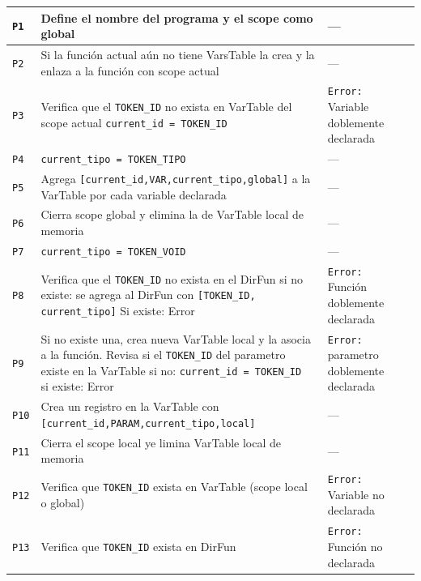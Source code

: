 \documentclass[12pt, letterpaper]{article}
\theoremstyle{definition}
\begin{document}
\begin{longtable}{|p{1cm}|p{5.5cm}|p{4cm}|p{3cm}|}
    \texttt{P1} &
    Define el nombre del programa y el scope como global &
    --- \\ \hline
    \texttt{P2} &
    Si la función actual aún no tiene  VarsTable la crea y la enlaza a la función  con scope actual&
    --- \\ \hline
    \texttt{P3} &
    Verifica que el \texttt{TOKEN\_ID} no exista en VarTable del scope actual 
    \break \break 
    \texttt{{{current\_id = TOKEN\_ID}}} &
    \texttt{Error:} Variable doblemente declarada \\ \hline
    \texttt{P4} & 
    \texttt{{{current\_tipo = TOKEN\_TIPO}}}  &
    --- \\ \hline
    \texttt{P5} & 
    Agrega 
    \break 
    \texttt{[current\_id,VAR,current\_tipo,\break global]}
    \break
    a la VarTable por cada variable declarada&
    --- \\ \hline
    \texttt{P6} & 
     Cierra scope global y elimina la de VarTable local de memoria &
    --- \\ \hline
    \texttt{P7} &
    \texttt{{{current\_tipo = TOKEN\_VOID}}}   &
    --- \\ \hline
    \texttt{P8} & 
    Verifica que el \texttt{TOKEN\_ID} no exista en el DirFun
    \break \break
    si no existe: se agrega al DirFun con
    \break   
    \texttt{[TOKEN\_ID,  current\_tipo]}
    \break\break
    Si existe: Error  &
    \texttt{Error:} Función doblemente declarada \\ \hline
    \texttt{P9} & 
    Si no existe una, crea nueva VarTable local y la asocia a la función.
    Revisa si el \texttt{TOKEN\_ID} del parametro existe en la VarTable
    \break \break
    si no: \texttt{current\_id  = TOKEN\_ID }
    \break\break
    si existe: Error &   
    \texttt{Error:} parametro doblemente declarada \\ \hline
    \texttt{P10} & 
    Crea un registro en la VarTable con
    \break
    \texttt{[current\_id,PARAM,current\_tipo,\break local]} &
    --- \\ \hline
    \texttt{P11} &
    Cierra el scope local ye limina VarTable local de memoria &
    --- \\ \hline
    \texttt{P12} & 
    Verifica que \texttt{TOKEN\_ID} exista en VarTable (scope local o global) &
    \texttt{Error:} Variable no declarada \\ \hline
    \texttt{P13} & 
    Verifica que \texttt{TOKEN\_ID} exista en DirFun &
    \texttt{Error:} Función no declarada \\ \hline

\end{longtable}
\end{document}
